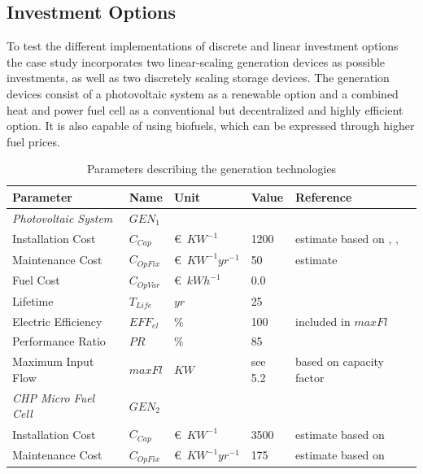 \documentclass[
	11pt,								%
	DIV10,								%
	a4paper,         					%
	oneside,							%
	headheight=20pt,					%
	footheight=20pt,					%
    parskip=full,						%
    listof=totoc,						%
	bibliography=totoc,					%
	index=totoc,						%
]{scrartcl}
\begin{document}
\subsection{Investment Options}
To test the different implementations of discrete and linear investment options the case study incorporates two linear-scaling generation devices as possible investments, as well as two discretely scaling storage devices. The generation devices consist of a photovoltaic system as a renewable option and a combined heat and power fuel cell as a conventional but decentralized and highly efficient option. It is also capable of using biofuels, which can be expressed through higher fuel prices. 
\begin{table}[H]
	\centering
	\caption{Parameters describing the generation technologies}
	\begin{tabular}{llll|p{6cm}}
		\hline
		\textbf{Parameter}			& \textbf{Name}			& \textbf{Unit}			& \textbf{Value}	&\textbf{Reference}     \\ \hline
		\textit{Photovoltaic System} & $GEN_1$ & & &\\
		Installation Cost           & $C_{Cap}$     		& \euro\ $KW^{-1}$  		& 1200				& estimate based on \cite{wirthAktuelleFaktenZur2018}, \cite{SolarmoduleEBay2018}, \cite{ModulePriceIndex2018} \\
		Maintenance Cost            & $C_{OpFix}$     		& \euro\ $KW^{-1}yr^{-1}$& 50				& estimate \\
		Fuel	 Cost           			& $C_{OpVar}$     		& \euro\ $kWh^{-1}$   	& 0.0			&   \\
		Lifetime                    & $T_{Life}$     		& $yr$  				& 25 				& \cite{wirthAktuelleFaktenZur2018}  \\
		Electric Efficiency         & $EFF_{el}$     		& $\%$  				& 100				& included in $maxFl$      \\
		Performance Ratio           & $PR$     		& $\%$  				& 85				& \cite{wirthAktuelleFaktenZur2018}  \\
		Maximum Input Flow  			& $maxFl$     		& $KW$ 		 			& see 5.2				& based on capacity factor   \\
		\hline
		\textit{CHP Micro Fuel Cell} & $GEN_2$ & & &\\
		Installation Cost           & $C_{Cap}$     		& \euro\ $KW^{-1}$  		& 3500 				& estimate based on \cite{LAUINGER201624}  \\
		Maintenance Cost            & $C_{OpFix}$     		& \euro\ $KW^{-1}yr^{-1}$& 175				& estimate based on \cite{LAUINGER201624}  \\

\end{tabular}
\end{table}
\end{document}
